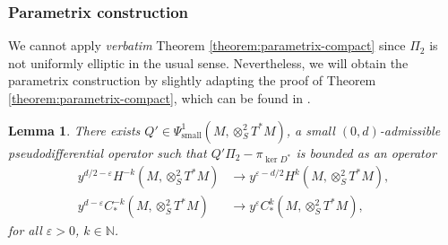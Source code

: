 \documentclass[JEP,XML,SOM,Unicode,NoFloatCountersInSection]{cedram}
\newcommand{\N}{\mathbb{N}}
\newcommand{\eps}{\varepsilon}
\theoremstyle{plain}
\newtheorem{lemma}{Lemma}[section]
\theoremstyle{definition}
\begin{document}
\subsubsection{Parametrix construction}

We cannot apply \emph{verbatim} Theorem \ref{theorem:parametrix-compact} since $\Pi_2$ is not uniformly elliptic in the usual sense. Nevertheless, we will obtain the parametrix construction by slightly adapting the proof of Theorem \ref{theorem:parametrix-compact}, which can be found in \cite[\S 4.2.3]{Bonthonneau-Lefeuvre-19-1}.

\begin{lemma}
\label{lemma:parametrix}
There exists $Q' \in \Psi^1_{\mathrm{small}}(M,\otimes^2_S T^*M)$, a small $(0,d)$-admissible pseudodifferential operator such that $Q'\Pi_2-\pi_{\ker D^*}$ is bounded as an operator
\[
\begin{split}
y^{d/2-\eps}H^{-k}(M,\otimes^2_S T^*M) &\to y^{\eps-d/2}H^{k}(M,\otimes^2_S T^*M), \\
y^{d-\eps}C^{-k}_*(M,\otimes^2_S T^*M) &\to y^{\eps}C^{k}_*(M,\otimes^2_S T^*M),
\end{split}
\]
for all $\eps > 0$, $k \in \N$.
\end{lemma}
\end{document}
